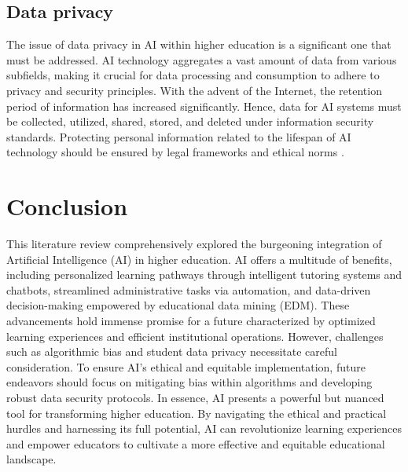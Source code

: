 
\subsection{Data privacy}
The issue of data privacy in AI within higher education is a significant one that must be addressed.
AI technology aggregates a vast amount of data from various subfields, making it crucial for data
processing and consumption to adhere to privacy and security principles. With the advent of the Internet,
the retention period of information has increased significantly. Hence, data for AI systems must be collected,
utilized, shared, stored, and deleted under information security standards. Protecting personal information
related to the lifespan of AI technology should be ensured by legal frameworks and ethical norms \citep{unesco_2022}.

\section{Conclusion}
This literature review comprehensively explored the burgeoning integration of Artificial Intelligence (AI) in higher education.
AI offers a multitude of benefits, including personalized learning pathways through intelligent tutoring systems and chatbots,
streamlined administrative tasks via automation, and data-driven decision-making empowered by educational data mining (EDM).
These advancements hold immense promise for a future characterized by optimized learning experiences and efficient institutional
operations. However, challenges such as algorithmic bias and student data privacy necessitate careful consideration.
To ensure AI's ethical and equitable implementation, future endeavors should focus on mitigating bias within algorithms and developing
robust data security protocols. In essence, AI presents a powerful but nuanced tool for transforming higher education.
By navigating the ethical and practical hurdles and harnessing its full potential, AI can revolutionize learning experiences
and empower educators to cultivate a more effective and equitable educational landscape.
